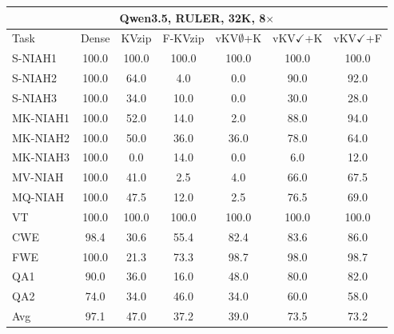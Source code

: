 \begin{tabular}{lcccccc}
\toprule
\multicolumn{7}{c}{Qwen3.5, RULER, 32K, 8$\times$} \\
\midrule
Task & Dense & KVzip & F-KVzip & vKV$\emptyset$+K & vKV$\checkmark$+K & vKV$\checkmark$+F \\
\midrule
S-NIAH1 & 100.0 & 100.0 & 100.0 & 100.0 & 100.0 & 100.0 \\
S-NIAH2 & 100.0 & 64.0 & 4.0 & 0.0 & 90.0 & 92.0 \\
S-NIAH3 & 100.0 & 34.0 & 10.0 & 0.0 & 30.0 & 28.0 \\
MK-NIAH1 & 100.0 & 52.0 & 14.0 & 2.0 & 88.0 & 94.0 \\
MK-NIAH2 & 100.0 & 50.0 & 36.0 & 36.0 & 78.0 & 64.0 \\
MK-NIAH3 & 100.0 & 0.0 & 14.0 & 0.0 & 6.0 & 12.0 \\
MV-NIAH & 100.0 & 41.0 & 2.5 & 4.0 & 66.0 & 67.5 \\
MQ-NIAH & 100.0 & 47.5 & 12.0 & 2.5 & 76.5 & 69.0 \\
VT & 100.0 & 100.0 & 100.0 & 100.0 & 100.0 & 100.0 \\
CWE & 98.4 & 30.6 & 55.4 & 82.4 & 83.6 & 86.0 \\
FWE & 100.0 & 21.3 & 73.3 & 98.7 & 98.0 & 98.7 \\
QA1 & 90.0 & 36.0 & 16.0 & 48.0 & 80.0 & 82.0 \\
QA2 & 74.0 & 34.0 & 46.0 & 34.0 & 60.0 & 58.0 \\
\midrule
Avg & 97.1 & 47.0 & 37.2 & 39.0 & 73.5 & 73.2 \\
\bottomrule
\end{tabular}
\vspace{0.8em}

